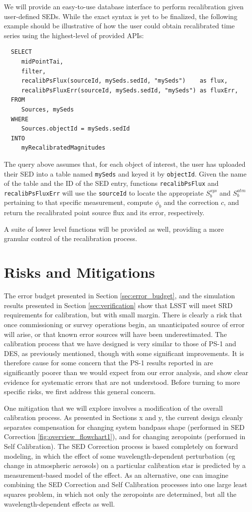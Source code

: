 \documentclass[12pt,preprint]{aastex}
\begin{document}
We will provide an easy-to-use database interface to perform recalibration given user-defined SEDs. While the exact syntax is yet to be finalized, the following example should be illustrative of how the user could obtain recalibrated time series using the highest-level of provided APIs:
%
\begin{verbatim}
  SELECT
     midPointTai,
     filter,
     recalibPsFlux(sourceId, mySeds.sedId, "mySeds")    as flux,
     recalibPsFluxErr(sourceId, mySeds.sedId, "mySeds") as fluxErr,
  FROM
     Sources, mySeds
  WHERE
     Sources.objectId = mySeds.sedId
  INTO
     myRecalibratedMagnitudes
\end{verbatim}
%
The query above assumes that, for each object of interest, the user has uploaded their SED into a table named {\tt mySeds} and keyed it by {\tt objectId}. Given the name of the table and the ID of the SED entry, functions {\tt recalibPsFlux} and {\tt recalibPsFluxErr} will use the {\tt sourceId} to locate the appropriate $S_b^{sys}$ and $S_b^{atm}$ pertaining to that specific measurement, compute $\phi_b$ and the correction $c$, and return the recalibrated point source flux and its error, respectively.

A suite of lower level functions will be provided as well, providing a more granular control of the recalibration process.

\section{Risks and Mitigations}
\label{sec:risks}
The error budget presented in Section \ref{sec:error_budget}, and the simulation results presented in Section \ref{sec:verification} show that
LSST will meet SRD requirements for calibration, but with small margin.   There is clearly a risk
that once commissioning or survey operations begin, an unanticipated source of error will arise, or
that known error sources will have been underestimated.
The calibration process that we have designed is very similar to those of PS-1 and DES, as previously mentioned, though with some significant improvements.  It is therefore
cause for some concern that the PS-1 results reported in \citep{Tonry2012} are 
significantly poorer than we would expect from our
error analysis, and show clear evidence for systematic errors that are not understood.
Before turning to more specific risks, we first address this general concern.

One mitigation that we will explore involves a modification of the overall calibration process.  As presented in Sections x and y, the current design cleanly separates compensation for changing system
bandpass shape (performed in SED Correction \ref{fig:overview_flowchart1}), and for changing zeropoints
(performed in Self Calibration).  The SED Correction process is based completely on forward modeling,
in which the effect of some wavelength-dependent perturbation (eg change in atmospheric aerosols) on
a particular calibration star is predicted by a measurement-based model of the effect.  As
an alternative, one can imagine combining the SED Correction and Self Calibration processes into one
large least squares problem, in which not only the zeropoints are determined, but all the 
wavelength-dependent effects as well.  
\end{document}
